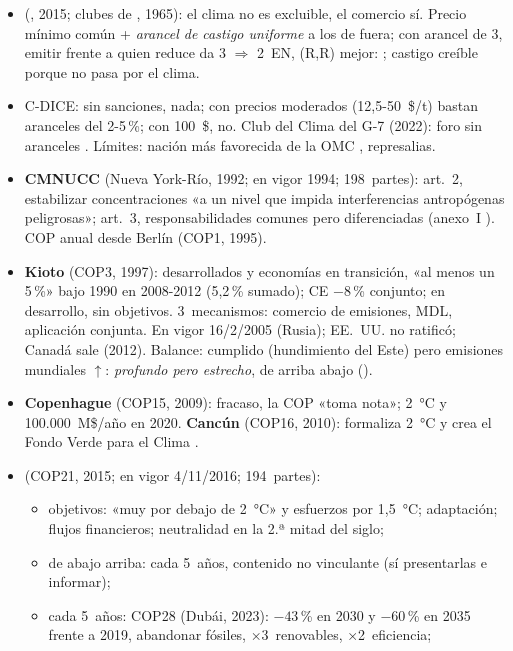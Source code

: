 \documentclass{article}
\begin{document}
\begin{columnas}
\begin{itemize}
\item {} (, 2015; clubes de , 1965): el clima no es excluible, el comercio sí. Precio mínimo común + \emph{arancel de castigo uniforme} a los de fuera; con arancel de 3, emitir frente a quien reduce da 3 $\Rightarrow$ 2~EN, (R,R) mejor: ; castigo creíble porque no pasa por el clima.
\item C-DICE: sin sanciones, nada; con precios moderados (12,5-50~\$/t) bastan aranceles del 2-5\,\%; con 100~\$, no. Club del Clima del G-7 (2022): foro sin aranceles . Límites: nación más favorecida de la OMC , represalias.
\end{itemize}

\begin{itemize}
\item \textbf{CMNUCC} (Nueva York-Río, 1992; en vigor 1994; 198~partes): art.~2, estabilizar concentraciones «a un nivel que impida interferencias antropógenas peligrosas»; art.~3, responsabilidades comunes pero diferenciadas (anexo~I ). COP anual desde Berlín (COP1, 1995).
\item \textbf{Kioto} (COP3, 1997): desarrollados y economías en transición, «al menos un 5\,\%» bajo 1990 en 2008-2012 (5,2\,\% sumado); CE $-8$\,\% conjunto; en desarrollo, sin objetivos. 3~mecanismos: comercio de emisiones, MDL, aplicación conjunta. En vigor 16/2/2005 (Rusia); EE.~UU. no ratificó; Canadá sale (2012). Balance: cumplido (hundimiento del Este) pero emisiones mundiales $\uparrow$: \emph{profundo pero estrecho}, de arriba abajo ().
\item \textbf{Copenhague} (COP15, 2009): fracaso, la COP «toma nota»; 2~°C y 100.000~M\$/año en 2020. \textbf{Cancún} (COP16, 2010): formaliza 2~°C y crea el Fondo Verde para el Clima .
\item {} (COP21, 2015; en vigor 4/11/2016; 194~partes):
  \begin{itemize}
  \item objetivos: «muy por debajo de 2~°C» y esfuerzos por 1,5~°C; adaptación; flujos financieros; neutralidad en la 2.ª mitad del siglo;
  \item de abajo arriba:  cada 5~años, contenido no vinculante (sí presentarlas e informar);
  \item {} cada 5~años: COP28 (Dubái, 2023): $-43$\,\% en 2030 y $-60$\,\% en 2035 frente a 2019, abandonar fósiles, ×3~renovables, ×2~eficiencia;

\end{itemize}
\end{itemize}
\end{columnas}
\end{document}
